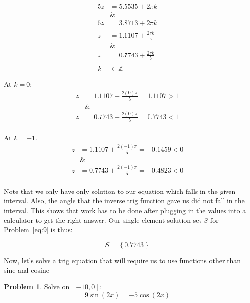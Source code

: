 \documentclass[12pt]{article}
\theoremstyle{definition}
\newtheorem{problem}{Problem}
\begin{document}
\begin{align}
    5z        & = 5.5535 + 2\pi k           \\
    \nonumber & \&                          \\
    5z        & = 3.8713 + 2\pi k           \\
    \nonumber                               \\
    z         & = 1.1107 + \frac{2\pi k}{5} \\
    \nonumber & \&                          \\
    z         & = 0.7743 + \frac{2\pi k}{5} \\
    \nonumber                               \\
    k         & \in \mathbb{Z}
\end{align}

At $k=0$:
\begin{align}
    z         & = 1.1107 + \frac{2(0)\pi}{5} = 1.1107 > 1 \\
    \nonumber & \&                                        \\
    z         & = 0.7743 + \frac{2(0)\pi}{5} = 0.7743 < 1 \\
\end{align}

At $k=-1$:
\begin{align}
    z         & = 1.1107 + \frac{2(-1)\pi}{5} = -0.1459 < 0 \\
    \nonumber & \&                                          \\
    z         & = 0.7743 + \frac{2(-1)\pi}{5} = -0.4823 < 0 \\
\end{align}

Note that we only have only solution to our equation which falls in the given interval.
Also, the angle that the inverse trig function gave us did not fall in the interval.
This shows that work has to be done after plugging in the values into a calculator to get the right answer.
Our single element solution set $S$ for Problem~\eqref{eq:9} is thus:

\begin{equation}
    S = \left\{ 0.7743 \right\}
\end{equation}

Now, let's solve a trig equation that will require us to use functions other than sine and cosine.

\begin{problem}
Solve on $[-10, 0]$:
\begin{equation*}
    9\sin(2x) = -5\cos(2x) \label{eq:10}
\end{equation*}
\end{problem}
\end{document}
